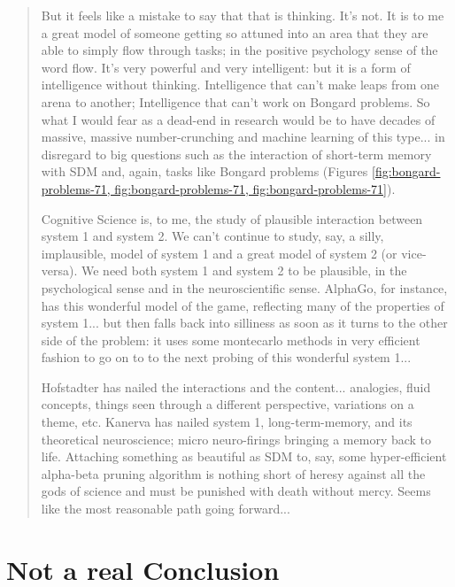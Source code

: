 \begin{quote}
    But it feels like a mistake to say that that is thinking.  It's not.  It is to me a great model of someone getting so attuned into an area that they are able to simply flow through tasks; in the positive psychology sense of the word flow.  It's very powerful and very intelligent:  but it is a form of intelligence without thinking.  Intelligence that can't make leaps from one arena to another; Intelligence that can't work on Bongard problems.  So what I would fear as a dead-end in research would be to have decades of massive, massive number-crunching and machine learning of this type... in disregard to big questions such as the interaction of short-term memory with SDM and, again, tasks like Bongard problems (Figures \ref{fig:bongard-problems-71, fig:bongard-problems-71, fig:bongard-problems-71}).

    Cognitive Science is, to me, the study of plausible interaction between system 1 and system 2.  We can't continue to study, say, a silly, implausible, model of system 1 and a great model of system 2 (or vice-versa). We need both system 1 and system 2 to be plausible, in the psychological sense and in the neuroscientific sense.  AlphaGo, for instance, has this wonderful model of the game, reflecting many of the properties of system 1... but then falls back into silliness as soon as it turns to the other side of the problem:  it uses some montecarlo methods in very efficient fashion to go on to to the next probing of this wonderful system 1...

    Hofstadter has nailed the interactions and the content... analogies, fluid concepts, things seen through a different perspective, variations on a theme, etc.  Kanerva has nailed system 1, long-term-memory, and its  theoretical neuroscience; micro neuro-firings bringing a memory back to life.  Attaching something as beautiful as SDM to, say, some hyper-efficient alpha-beta pruning algorithm is nothing short of heresy against all the gods of science and must be punished with death without mercy. Seems like the most reasonable path going forward...

\end{quote}



\section{Not a real Conclusion}

